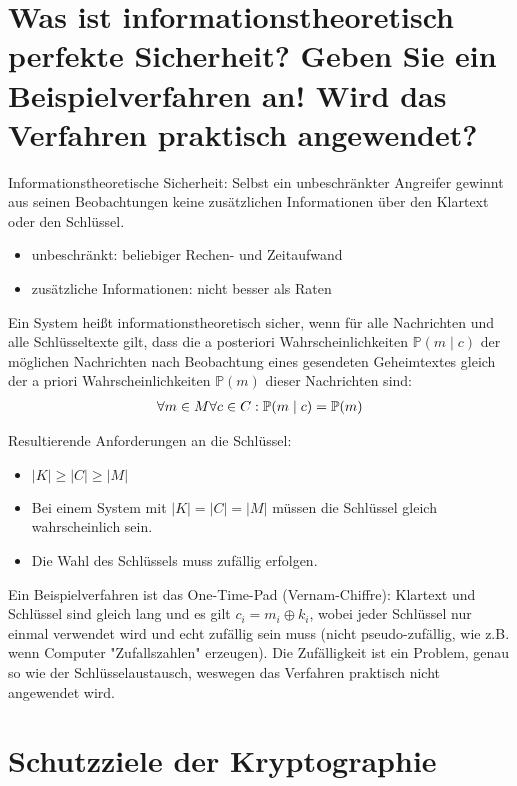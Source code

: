 \documentclass{article}
\begin{document}
	\section*{Was ist informationstheoretisch perfekte Sicherheit? Geben Sie ein Beispielverfahren an! Wird das Verfahren praktisch angewendet?}
	
	Informationstheoretische Sicherheit: Selbst ein unbeschränkter Angreifer gewinnt aus seinen Beobachtungen keine zusätzlichen Informationen über den Klartext oder den Schlüssel.
	\begin{itemize}
		\item unbeschränkt: beliebiger Rechen- und Zeitaufwand
		\item zusätzliche Informationen: nicht besser als Raten
	\end{itemize}

	Ein System heißt informationstheoretisch sicher, wenn für alle Nachrichten und alle Schlüsseltexte gilt, dass die a posteriori Wahrscheinlichkeiten $\mathbb{P}(m\mid c)$ der möglichen Nachrichten nach Beobachtung eines gesendeten Geheimtextes gleich der a priori Wahrscheinlichkeiten $\mathbb{P}(m)$ dieser Nachrichten sind:
	\begin{align}
		\forall m\in M\forall c\in C: \mathbb{P}(m\mid c) = \mathbb{P}(m) \notag
	\end{align}

	Resultierende Anforderungen an die Schlüssel:
	\begin{itemize}
		\item $\vert K\vert \ge \vert C\vert \ge \vert M\vert$
		\item Bei einem System mit $\vert K\vert = \vert C\vert = \vert M\vert$ müssen die Schlüssel gleich wahrscheinlich sein.
		\item Die Wahl des Schlüssels muss zufällig erfolgen.
	\end{itemize}

	Ein Beispielverfahren ist das One-Time-Pad (Vernam-Chiffre): Klartext und Schlüssel sind gleich lang und es gilt $c_i = m_i \oplus k_i$, wobei jeder Schlüssel nur einmal verwendet wird und echt zufällig sein muss (nicht pseudo-zufällig, wie z.B. wenn Computer "Zufallszahlen" erzeugen). Die Zufälligkeit ist ein Problem, genau so wie der Schlüsselaustausch, weswegen das Verfahren praktisch nicht angewendet wird.
	
	\section*{Schutzziele der Kryptographie}
	
\end{document}
